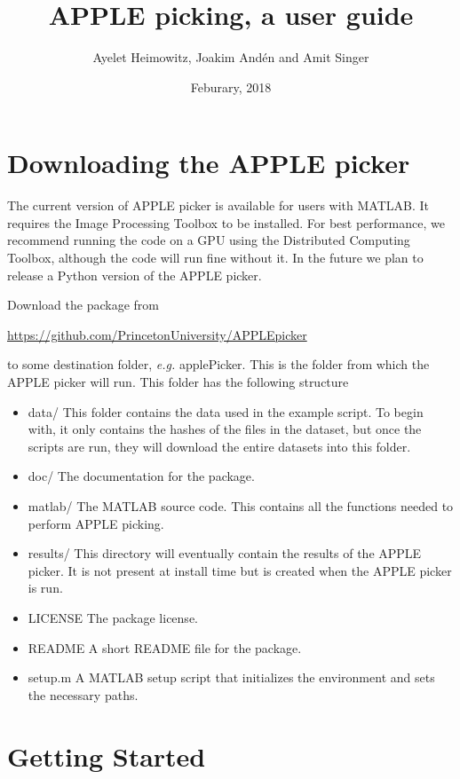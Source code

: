 \documentclass[12pt,a4paper]{article}
\title{APPLE picking, a user guide}
\author{Ayelet Heimowitz, Joakim And\'{e}n and Amit Singer}
\date{Feburary, 2018}
\begin{document}
\maketitle

\justify

\section{Downloading the APPLE picker}

The current version of APPLE picker is available for users with MATLAB. It requires the Image Processing Toolbox to be installed. For best performance, we recommend running the code on a GPU using the Distributed Computing Toolbox, although the code will run fine without it. In the future we plan to release a Python version of the APPLE picker.

Download the package from
\begin{center}
\url{https://github.com/PrincetonUniversity/APPLEpicker}
\end{center}
to some destination folder, \textit{e.g.} \textsf{applePicker}.
This is the folder from which the APPLE picker will run. This folder has the following structure
\begin{itemize}
\item \textsf{data/} This folder contains the data used in the example script. To begin with, it only contains the hashes of the files in the dataset, but once the scripts are run, they will download the entire datasets into this folder.
\item \textsf{doc/} The documentation for the package.
\item \textsf{matlab/} The MATLAB source code. This contains all the functions needed to perform APPLE picking.
\item \textsf{results/} This directory will eventually contain the results of the APPLE picker. It is not present at install time but is created when the APPLE picker is run.
\item \textsf{LICENSE} The package license.
\item \textsf{README} A short README file for the package.
\item \textsf{setup.m} A MATLAB setup script that initializes the environment and sets the necessary paths.
\end{itemize}

\section{Getting Started}
\end{document}
